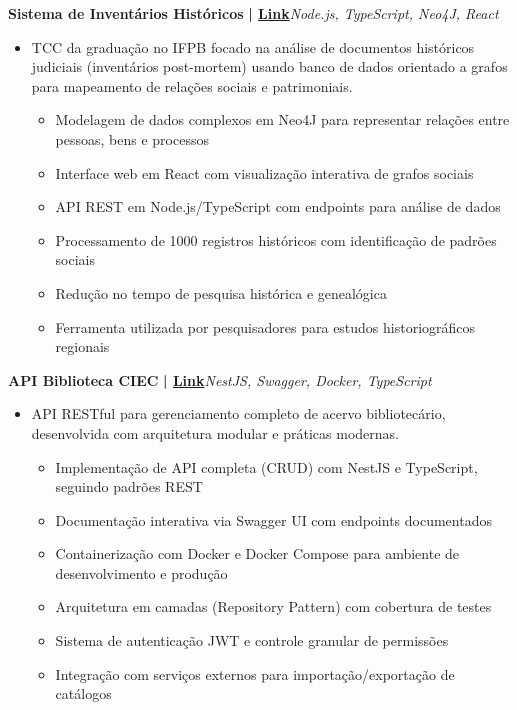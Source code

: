 \documentclass[a4paper]{article}
\begin{document}
{\textbf{Sistema de Inventários Históricos}}\textbf{ | \href{https://repositorio.ifpb.edu.br/handle/177683/2898}{Link}}\hfill{\sl Node.js, TypeScript, Neo4J, React}\\
\vspace{-3mm}
\begin{itemize} \itemsep -3pt
    \item[] TCC da graduação no IFPB focado na análise de documentos históricos judiciais (inventários post-mortem) usando banco de dados orientado a grafos para mapeamento de relações sociais e patrimoniais.
        \begin{itemize}
            \item Modelagem de dados complexos em Neo4J para representar relações entre pessoas, bens e processos
            \item Interface web em React com visualização interativa de grafos sociais
            \item API REST em Node.js/TypeScript com endpoints para análise de dados
            \item Processamento de 1000 registros históricos com identificação de padrões sociais
            \item Redução no tempo de pesquisa histórica e genealógica
            \item Ferramenta utilizada por pesquisadores para estudos historiográficos regionais
        \end{itemize}
\end{itemize}
\vspace*{2mm}

{\textbf{API Biblioteca CIEC}}\textbf{ | \href{https://github.com/Alttabcorp/API-bibliteca_siec}{Link}}\hfill{\sl NestJS, Swagger, Docker, TypeScript}\\
\vspace{-3mm}
\begin{itemize} \itemsep -3pt
    \item[] API RESTful para gerenciamento completo de acervo bibliotecário, desenvolvida com arquitetura modular e práticas modernas.
        \begin{itemize}
            \item Implementação de API completa (CRUD) com NestJS e TypeScript, seguindo padrões REST
            \item Documentação interativa via Swagger UI com endpoints documentados
            \item Containerização com Docker e Docker Compose para ambiente de desenvolvimento e produção
            \item Arquitetura em camadas (Repository Pattern) com cobertura de testes
            \item Sistema de autenticação JWT e controle granular de permissões
            \item Integração com serviços externos para importação/exportação de catálogos
        \end{itemize}
\end{itemize}
\vspace*{2mm}
\end{document}
